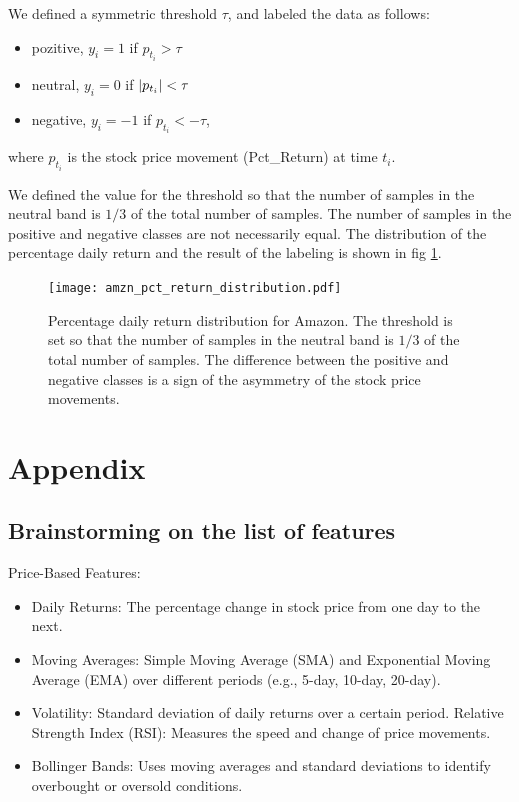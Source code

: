 \documentclass{article}
\begin{document}
We defined a symmetric threshold $\tau$, and labeled the data as follows:
\begin{itemize}
    \item pozitive, $y_i = 1$ if $p_{t_i} > \tau$
    \item neutral, $y_i = 0$ if $\abs{p_{t_i}} < \tau$
    \item negative, $y_i = -1$ if $p_{t_i} < - \tau$,
\end{itemize}

where $p_{t_i}$ is the stock price movement (Pct\_Return) at time $t_i$.

We defined the value for the threshold so that
the number of samples in the neutral band is $1/3$ of the total number of samples.
The number of samples in the positive and negative classes are not necessarily equal.
The distribution of the percentage daily return and the result of the labeling
is shown in fig \ref{fig:amazon_labelled_pct_return}.

\begin{figure}[ht]
    \centering
    \texttt{[image: amzn\_pct\_return\_distribution.pdf]}
    \caption{Percentage daily return distribution for Amazon.
        The threshold is set so that the number of samples in the neutral band
        is $1/3$ of the total number of samples. The difference between the
        positive and negative classes is a sign of the asymmetry of the
        stock price movements.}
    \label{fig:amazon_labelled_pct_return}
\end{figure}




\section*{Appendix}
\subsection*{Brainstorming on the list of features}
\small

Price-Based Features:

\begin{itemize}
    \item Daily Returns: The percentage change in stock price from one day to the next.
    \item Moving Averages: Simple Moving Average (SMA) and Exponential Moving Average (EMA) over different periods (e.g., 5-day, 10-day, 20-day).
    \item Volatility: Standard deviation of daily returns over a certain period. Relative Strength Index (RSI): Measures the speed and change of price movements.
    \item Bollinger Bands: Uses moving averages and standard deviations to identify overbought or oversold conditions.
\end{itemize}
\end{document}
